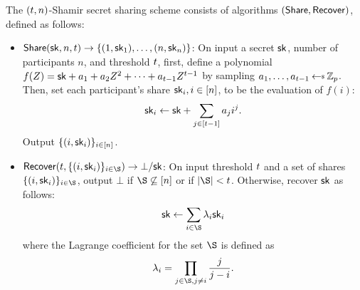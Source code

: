 \begin{definition} \label{defn:shamir}
The $(t, n)$-Shamir secret sharing scheme consists of algorithms $(\mathsf{Share}, \allowbreak \mathsf{Recover})$, defined as follows:

\begin{itemize}[itemsep=1mm]
    \item $\mathsf{Share}(\mathsf{sk}, n, t) \rightarrow \{ (1, \mathsf{sk}_1), \ldots, (n, \mathsf{sk}_n)\}$:
      On input a secret $\mathsf{sk}$, number of participants $n$, and threshold $t$, first, define a polynomial $f(Z) = \mathsf{sk} + a_1 + a_2 Z^2 + \cdots + a_{t-1} Z^{t-1}$ by sampling $a_1, \ldots, a_{\tcor} \randpick \Zp$. Then, set each participant's share $\mathsf{sk}_i, i \in [n]$, to be the evaluation of $f(i)$:
    \begin{equation*} \label{eq:issueshares}
        \mathsf{sk}_i \gets \mathsf{sk} + \sum_{j \in [t-1]} a_j i^j.
    \end{equation*}
    Output $\{(i, \mathsf{sk}_i) \}_{i \in [n]}$.

  \item $ \Recover(\thresh, \{ (i, \sk_i)\}_{ i \in \S}) \rightarrow \bot / \sk$:
    On input threshold $t$ and a set of shares $\{(i, \sk_i) \}_{i \in \S}$,
    output $\bot$ if $\S \not\subseteq \set{n}$ or if $\lvert \S \rvert < \thresh$. Otherwise, recover $\mathsf{sk}$ as follows:
    \begin{equation*} \label{eq:recovershares}
      \sk \gets \sum_{i \in \S} \lambda_i \sk_i
    \end{equation*}
    where the Lagrange coefficient for the set
$\S$ is defined as
\[ \lambda_i = \prod_{j \in \S, j\neq i} \frac{j}{j - i} .\]
\end{itemize}
\end{definition}

